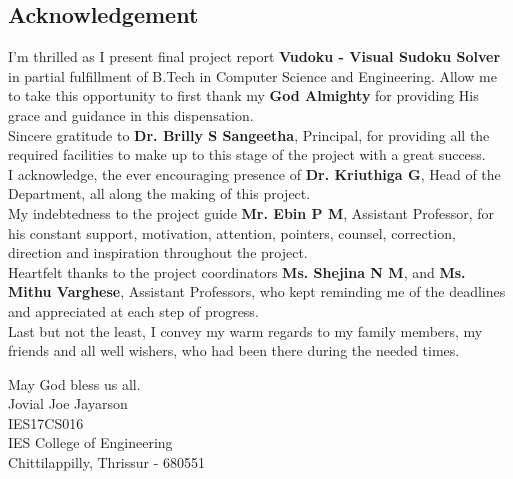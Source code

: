 \documentclass[12pt, a4paper]{report}
\begin{document}
\newpage
\vspace*{\fill}
\begin{center}
    \section*{\centering \huge Acknowledgement}
\end{center}

\noindent I'm thrilled as I present final project report \textbf{Vudoku - Visual Sudoku Solver} in partial fulfillment of B.Tech in Computer Science and Engineering. Allow me to take this opportunity to first thank my \textbf{God Almighty} for providing His grace and guidance in this dispensation.\\

\noindent Sincere gratitude to \textbf{Dr. Brilly S Sangeetha}, Principal, for providing all the required facilities to make up to this stage of the project with a great success.\\

\noindent I acknowledge, the ever encouraging presence of \textbf{Dr. Kriuthiga G}, Head of the Department, all along the making of this project.\\

\noindent My indebtedness to the project guide \textbf{Mr. Ebin P M}, Assistant Professor, for his constant support, motivation, attention, pointers, counsel, correction, direction and inspiration throughout the project.\\

\noindent Heartfelt thanks to the project coordinators \textbf{Ms. Shejina N M}, and \textbf{Ms. Mithu Varghese}, Assistant Professors, who kept reminding me of the deadlines and appreciated at each step of progress.\\

\noindent Last but not the least, I convey my warm regards to my family members, my friends and all well wishers, who had been there during the needed times.\\

\begin{center}
    May God bless us all.\\[4cm]
    Jovial Joe Jayarson\\
    IES17CS016\\
    IES College of Engineering\\
    Chittilappilly, Thrissur - 680551
\end{center}
\vspace*{\fill}
\end{document}
